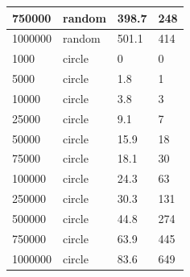 \documentclass[12pt]{article}
\begin{document}
\begin{table}[h!]
\begin{tabular}{|l|l|l|l|}
750000  & random & 398.7                     & 248               \\ \hline
1000000 & random & 501.1                     & 414               \\ \hline
1000    & circle & 0                         & 0                 \\ \hline
5000    & circle & 1.8                       & 1                 \\ \hline
10000   & circle & 3.8                       & 3                 \\ \hline
25000   & circle & 9.1                       & 7                 \\ \hline
50000   & circle & 15.9                      & 18                \\ \hline
75000   & circle & 18.1                      & 30                \\ \hline
100000  & circle & 24.3                      & 63                \\ \hline
250000  & circle & 30.3                      & 131               \\ \hline
500000  & circle & 44.8                      & 274               \\ \hline
750000  & circle & 63.9                      & 445               \\ \hline
1000000 & circle & 83.6                      & 649               \\ \hline
\end{tabular}
\label{tab:SweepLine}
\end{table}
\end{document}
